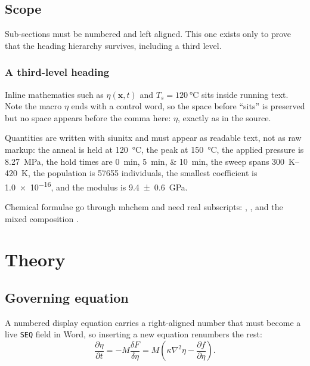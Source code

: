 \documentclass[pdflatex]{sn-jnl}
\newcommand{\order}{\eta}
\begin{document}
\subsection{Scope}\label{sec:intro:scope}

Sub-sections must be numbered and left aligned. This one exists only to prove
that the heading hierarchy survives, including a third level.

\subsubsection{A third-level heading}

Inline mathematics such as $\order(\mathbf{x},t)$ and $T_s = \SI{120}{\celsius}$ sits
inside running text. Note the macro $\order$ ends with a control word, so the
space before ``sits'' is preserved but no space appears before the comma here:
$\order$, exactly as in the source.

Quantities are written with siunitx and must appear as readable text, not as raw
markup: the anneal is held at \qty{120}{\celsius}, the peak at \qty{150}{\celsius},
the applied pressure is \qty{8.27}{\mega\pascal}, the hold times are
\qtylist{0;5;10}{\minute}, the sweep spans \qtyrange{300}{420}{\kelvin}, the
population is \num{57655} individuals, the smallest coefficient is
\num{1.0e-16}, and the modulus is \qty{9.4 \pm 0.6}{\giga\pascal}.

Chemical formulae go through mhchem and need real subscripts: ,
, and the mixed composition .

\section{Theory}\label{sec:theory}

\subsection{Governing equation}\label{sec:theory:governing}

A numbered display equation carries a right-aligned number that must become a
live \verb|SEQ| field in Word, so inserting a new equation renumbers the rest:
\begin{equation}
  \frac{\partial\order}{\partial t} = -M\frac{\delta F}{\delta\order}
  = M\left(\kappa\nabla^2\order - \frac{\partial f}{\partial\order}\right).
  \label{eq:governing}
\end{equation}
\end{document}
